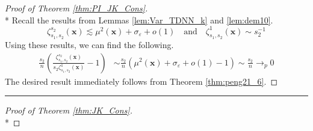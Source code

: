 \documentclass[letterpaper,10pt]{article}
\numberwithin{equation}{section}
\numberwithin{thm}{section}
\numberwithin{lem}{section}
\numberwithin{cor}{section}
\newcommand{\1}{\mathbbm{1}}
\begin{document}
\begin{proof}[Proof of Theorem \ref{thm:PI_JK_Cons}]\mbox{}\\*
	Recall the results from Lemmas \ref{lem:Var_TDNN_k} and \ref{lem:dem10}.
	\begin{equation*}
		\zeta_{s_1, s_2}^{s_2}\left(\mathbf{x}\right) \lesssim \mu^2(\mathbf{x}) + \sigma_{\varepsilon} + o(1)
		\quad \text{and} \quad
		\zeta_{s_1, s_2}^{1}\left(\mathbf{x}\right) \sim s_2^{-1}
	\end{equation*}
	Using these results, we can find the following.
	\begin{equation}
		\begin{aligned}
			\frac{s_2}{n}\left(\frac{
				\zeta_{s_1, s_2}^{s_2}\left(\mathbf{x}\right)}{s_2 \zeta_{s_1, s_2}^{1}\left(\mathbf{x}\right)} - 1\right)
			 & \sim \frac{s_2}{n}\left(\mu^2(\mathbf{x}) + \sigma_{\varepsilon} + o(1) - 1\right)
			\sim \frac{s_2}{n} \rightarrow_{p} 0
		\end{aligned}
	\end{equation}
	The desired result immediately follows from Theorem \ref{thm:peng21_6}.
\end{proof}

\hrule

\begin{proof}[Proof of Theorem \ref{thm:JK_Cons}]\mbox{}\\*

\end{proof}
\end{document}
